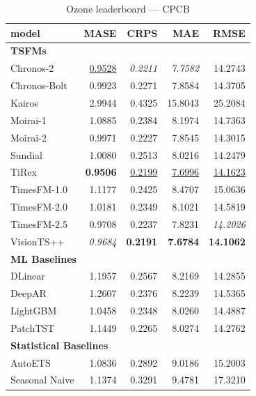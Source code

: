 \begin{table}[H]
\caption{Ozone leaderboard --- CPCB}
\centering
\begin{small}
\begin{tabular}{lrrrr}
\toprule
model & MASE & CRPS & MAE & RMSE \\
\midrule
\multicolumn{5}{l}{\textbf{TSFMs}} \\
Chronos-2 & \underline{0.9528} & \textit{0.2211} & \textit{7.7582} & 14.2743 \\
Chronos-Bolt & 0.9923 & 0.2271 & 7.8584 & 14.3705 \\
Kairos & 2.9944 & 0.4325 & 15.8043 & 25.2084 \\
Moirai-1 & 1.0885 & 0.2384 & 8.1974 & 14.7363 \\
Moirai-2 & 0.9971 & 0.2227 & 7.8545 & 14.3015 \\
Sundial & 1.0080 & 0.2513 & 8.0216 & 14.2479 \\
TiRex & \textbf{0.9506} & \underline{0.2199} & \underline{7.6996} & \underline{14.1623} \\
TimesFM-1.0 & 1.1177 & 0.2425 & 8.4707 & 15.0636 \\
TimesFM-2.0 & 1.0181 & 0.2349 & 8.1021 & 14.5819 \\
TimesFM-2.5 & 0.9708 & 0.2237 & 7.8231 & \textit{14.2026} \\
VisionTS++ & \textit{0.9684} & \textbf{0.2191} & \textbf{7.6784} & \textbf{14.1062} \\
\midrule
\multicolumn{5}{l}{\textbf{ML Baselines}} \\
DLinear & 1.1957 & 0.2567 & 8.2169 & 14.2855 \\
DeepAR & 1.2607 & 0.2376 & 8.2239 & 14.5365 \\
LightGBM & 1.0458 & 0.2348 & 8.0260 & 14.4887 \\
PatchTST & 1.1449 & 0.2265 & 8.0274 & 14.2762 \\
\midrule
\multicolumn{5}{l}{\textbf{Statistical Baselines}} \\
AutoETS & 1.0836 & 0.2892 & 9.0186 & 15.2003 \\
Seasonal Naive & 1.1374 & 0.3291 & 9.4781 & 17.3210 \\
\bottomrule
\end{tabular}
\end{small}
\end{table}